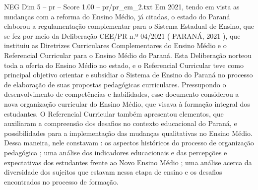 \begin{textsample}{NEG Dim 5 – pr – Score 1.00 – pr/pr\_em\_2.txt}
Em 2021, tendo em vista as mudanças com a reforma do Ensino Médio, já citadas, o estado do Paraná elaborou a regulamentação complementar para o Sistema Estadual de Ensino, que se fez por meio da Deliberação CEE/PR n.º 04/2021 ( PARANÁ, 2021 ), que instituiu as Diretrizes Curriculares Complementares do Ensino Médio e o Referencial Curricular para o Ensino Médio do Paraná.
Esta Deliberação norteou toda a oferta do Ensino Médio no estado, e o Referencial Curricular teve como principal objetivo orientar e subsidiar o Sistema de Ensino do Paraná no processo de elaboração de suas propostas pedagógicas curriculares.
Pressupondo o desenvolvimento de competências e habilidades, esse documento considerou a nova organização curricular do Ensino Médio, que visava à formação integral dos estudantes.
O Referencial Curricular também apresentou elementos, que auxiliaram a compreensão dos desafios no contexto educacional do Paraná, e possibilidades para a implementação das mudanças qualitativas no Ensino Médio.
Dessa maneira, nele constavam : os aspectos históricos do processo de organização pedagógica ; uma análise dos indicadores educacionais e das percepções e expectativas dos estudantes frente ao Novo Ensino Médio ; uma análise acerca da diversidade dos sujeitos que estavam nessa etapa de ensino e os desafios encontrados no processo de formação.

\end{textsample}
